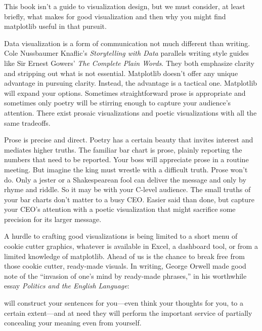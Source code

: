 
This book isn't a guide to visualization design, but we must consider, at least briefly, what makes for good visualization and then why you might find matplotlib useful in that pursuit. 

Data visualization is a form of communication not much different than writing. Cole Nussbaumer Knaflic's \emph{Storytelling with Data} parallels writing style guides like Sir Ernest Gowers' \emph{The Complete Plain Words}. They both emphasize clarity and stripping out what is not essential. Matplotlib doesn't offer any unique advantage in pursuing clarity. Instead, the advantage is a tactical one. Matplotlib will expand your options. Sometimes straightforward prose is appropriate and sometimes only poetry will be stirring enough to capture your audience's attention. There exist prosaic visualizations and poetic visualizations with all the same tradeoffs. 

Prose is precise and direct. Poetry has a certain beauty that invites interest and mediates higher truths. The familiar bar chart is prose, plainly reporting the numbers that need to be reported. Your boss will appreciate prose in a routine meeting. But imagine the king must wrestle with a difficult truth. Prose won't do. Only a jester or a Shakespearean fool can deliver the message and only by rhyme and riddle. So it may be with your C-level audience. The small truths of your bar charts don't matter to a busy CEO. Easier said than done, but capture your CEO's attention with a poetic visualization that might sacrifice some precision for its larger message. 


A hurdle to crafting good visualizations is being limited to a short menu of cookie cutter graphics, whatever is available in Excel, a dashboard tool, or from a limited knowledge of matplotlib. Ahead of us is the chance to break free from those cookie cutter, ready-made visuals. In writing, George Orwell made good note of the ``invasion of one's mind by ready-made phrases,'' in his worthwhile essay \textit{Politics and the English Language}: 

\begin{displayquote}
 will construct your sentences for you---even think your thoughts for you, to a certain extent---and at need they will perform the important service of partially concealing your meaning even from yourself.
\end{displayquote}

